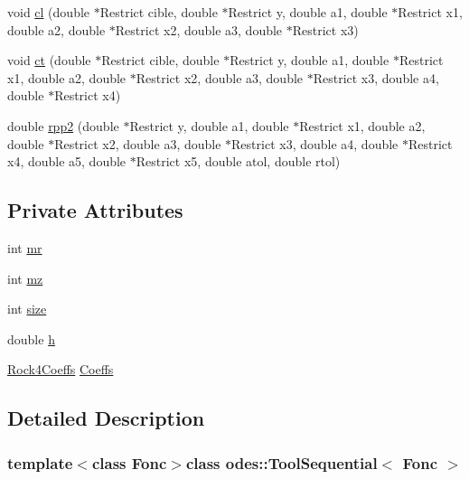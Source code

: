 \begin{DoxyCompactItemize}
\item 
void \hyperlink{classodes_1_1ToolSequential_a21f01a60762239df96d72d10efd60c9c}{cl} (double $\ast$Restrict cible, double $\ast$Restrict y, double a1, double $\ast$Restrict x1, double a2, double $\ast$Restrict x2, double a3, double $\ast$Restrict x3)
\item 
void \hyperlink{classodes_1_1ToolSequential_a8d4e4f3681112f2ff0f7ddd0e2975dd0}{ct} (double $\ast$Restrict cible, double $\ast$Restrict y, double a1, double $\ast$Restrict x1, double a2, double $\ast$Restrict x2, double a3, double $\ast$Restrict x3, double a4, double $\ast$Restrict x4)
\item 
double \hyperlink{classodes_1_1ToolSequential_acb8be967e6ba34773629a020e0ed207c}{rpp2} (double $\ast$Restrict y, double a1, double $\ast$Restrict x1, double a2, double $\ast$Restrict x2, double a3, double $\ast$Restrict x3, double a4, double $\ast$Restrict x4, double a5, double $\ast$Restrict x5, double atol, double rtol)
\end{DoxyCompactItemize}
\subsection*{Private Attributes}
\begin{DoxyCompactItemize}
\item 
int \hyperlink{classodes_1_1ToolSequential_a6a4ceae2b6963e6f0e610ff4964f7365}{mr}
\item 
int \hyperlink{classodes_1_1ToolSequential_ac5272f8a618d35954514a7002dad6536}{mz}
\item 
int \hyperlink{classodes_1_1ToolSequential_a43153d094b10b73072739d6e97ba86ad}{size}
\item 
double \hyperlink{classodes_1_1ToolSequential_ae7202d1172c35aa94d2d76642b8d6935}{h}
\item 
\hyperlink{structodes_1_1Rock4Coeffs}{Rock4\-Coeffs} \hyperlink{classodes_1_1ToolSequential_a0aa8a52176b407d740953c0b07b00ae0}{Coeffs}
\end{DoxyCompactItemize}


\subsection{Detailed Description}
\subsubsection*{template$<$class Fonc$>$class odes\-::\-Tool\-Sequential$<$ Fonc $>$}

